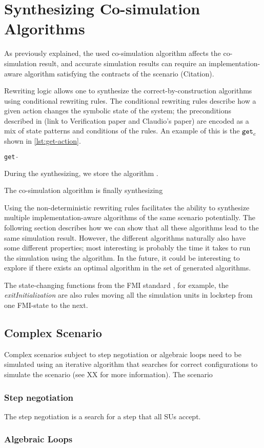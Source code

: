 \section{Synthesizing Co-simulation Algorithms}
As previously explained, the used co-simulation algorithm affects the co-simulation result, and accurate simulation results can require an implementation-aware algorithm satisfying the contracts of the scenario (Citation).

Rewriting logic allows one to synthesize the correct-by-construction algorithms using conditional rewriting rules.
The conditional rewriting rules describe how a given action changes the symbolic state of the system; the preconditions described in (link to Verification paper and Claudio's paper) are encoded as a mix of state patterns and conditions of the rules.
An example of this is the $\mathtt{get}_{c}$ shown in \ref{lst:get-action}.

\begin{lstlisting}[caption={The get-action rewriting rule.},label={lst:get-action},language=Java]
    get-
\end{lstlisting}

During the synthesizing, we store the algorithm .

The co-simulation algorithm is finally synthesizing 

Using the non-deterministic rewriting rules facilitates the ability to synthesize multiple implementation-aware algorithms of the same scenario potentially.
The following section describes how we can show that all these algorithms lead to the same simulation result.
However, the different algorithms naturally also have some different properties; most interesting is probably the time it takes to run the simulation using the algorithm. 
In the future, it could be interesting to explore if there exists an optimal algorithm in the set of generated algorithms.

The state-changing functions from the FMI standard \cite{FMI2014}, for example, the \textit{exitInitialization} are also rules moving all the simulation units in lockstep from one FMI-state to the next.

\subsection{Complex Scenario}
Complex scenarios subject to step negotiation or algebraic loops need to be simulated using an iterative algorithm that searches for correct configurations to simulate the scenario (see XX for more information).
The scenario 


\subsubsection{Step negotiation}
The step negotiation is a search for a step that all SUs accept.

\subsubsection{Algebraic Loops}

